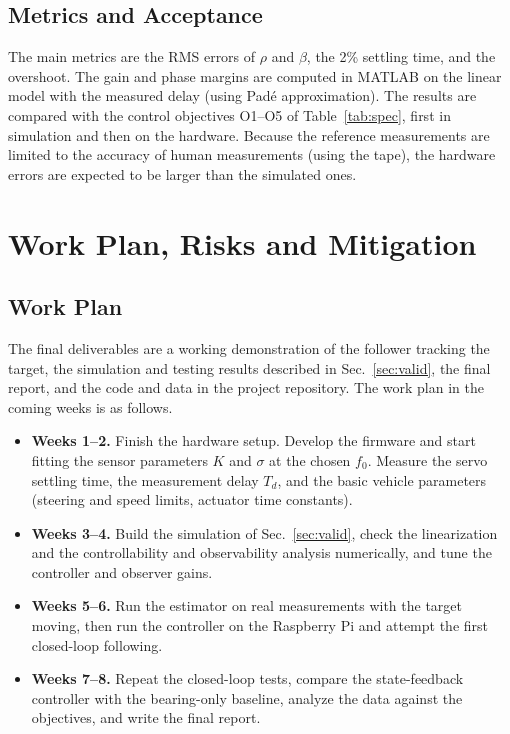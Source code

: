 \documentclass[journal,a4paper]{IEEEtran}
\begin{document}
\subsection{Metrics and Acceptance}
The main metrics are the RMS errors of $\rho$ and $\beta$, the 2\% settling time, and the overshoot. The gain and phase margins are computed in MATLAB on the linear model with the measured delay (using Pad\'e approximation). The results are compared with the control objectives O1--O5 of Table~\ref{tab:spec}, first in simulation and then on the hardware. Because the reference measurements are limited to the accuracy of human measurements (using the tape), the hardware errors are expected to be larger than the simulated ones.

\section{Work Plan, Risks and Mitigation}
\label{sec:plan}

\subsection{Work Plan}
The final deliverables are a working demonstration of the follower tracking the target, the simulation and testing results described in Sec.~\ref{sec:valid}, the final report, and the code and data in the project repository. The work plan in the coming weeks is as follows.
\begin{itemize}
    \item \textbf{Weeks 1--2.} Finish the hardware setup. Develop the firmware and start fitting the sensor parameters $K$ and $\sigma$ at the chosen $f_0$. Measure the servo settling time, the measurement delay $T_d$, and the basic vehicle parameters (steering and speed limits, actuator time constants).
    \item \textbf{Weeks 3--4.} Build the simulation of Sec.~\ref{sec:valid}, check the linearization and the controllability and observability analysis numerically, and tune the controller and observer gains.
    \item \textbf{Weeks 5--6.} Run the estimator on real measurements with the target moving, then run the controller on the Raspberry Pi and attempt the first closed-loop following.
    \item \textbf{Weeks 7--8.} Repeat the closed-loop tests, compare the state-feedback controller with the bearing-only baseline, analyze the data against the objectives, and write the final report.
\end{itemize}
\end{document}
